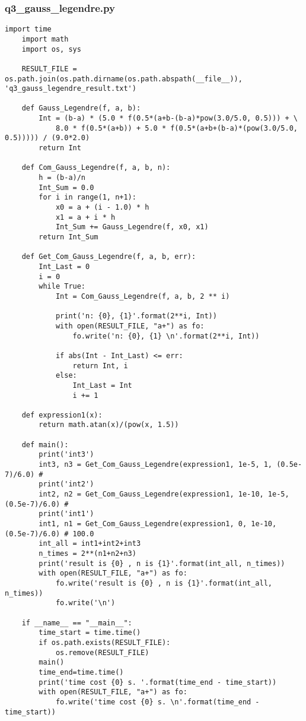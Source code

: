 \subsubsection{q3\_gauss\_legendre.py}

\begin{lstlisting}[style = python]
    import time
    import math
    import os, sys
    
    RESULT_FILE = os.path.join(os.path.dirname(os.path.abspath(__file__)), 'q3_gauss_legendre_result.txt')
    
    def Gauss_Legendre(f, a, b):
        Int = (b-a) * (5.0 * f(0.5*(a+b-(b-a)*pow(3.0/5.0, 0.5))) + \
            8.0 * f(0.5*(a+b)) + 5.0 * f(0.5*(a+b+(b-a)*(pow(3.0/5.0, 0.5))))) / (9.0*2.0)
        return Int
    
    def Com_Gauss_Legendre(f, a, b, n):
        h = (b-a)/n
        Int_Sum = 0.0
        for i in range(1, n+1):
            x0 = a + (i - 1.0) * h
            x1 = a + i * h
            Int_Sum += Gauss_Legendre(f, x0, x1)
        return Int_Sum
    
    def Get_Com_Gauss_Legendre(f, a, b, err):
        Int_Last = 0
        i = 0
        while True:
            Int = Com_Gauss_Legendre(f, a, b, 2 ** i)
    
            print('n: {0}, {1}'.format(2**i, Int))
            with open(RESULT_FILE, "a+") as fo:
                fo.write('n: {0}, {1} \n'.format(2**i, Int))
    
            if abs(Int - Int_Last) <= err:
                return Int, i
            else:
                Int_Last = Int
                i += 1
    
    def expression1(x):
        return math.atan(x)/(pow(x, 1.5))
    
    def main():
        print('int3')
        int3, n3 = Get_Com_Gauss_Legendre(expression1, 1e-5, 1, (0.5e-7)/6.0) # 
        print('int2')
        int2, n2 = Get_Com_Gauss_Legendre(expression1, 1e-10, 1e-5, (0.5e-7)/6.0) #
        print('int1')
        int1, n1 = Get_Com_Gauss_Legendre(expression1, 0, 1e-10, (0.5e-7)/6.0) # 100.0
        int_all = int1+int2+int3
        n_times = 2**(n1+n2+n3)
        print('result is {0} , n is {1}'.format(int_all, n_times))
        with open(RESULT_FILE, "a+") as fo:
            fo.write('result is {0} , n is {1}'.format(int_all, n_times))
            fo.write('\n')
    
    if __name__ == "__main__":
        time_start = time.time()
        if os.path.exists(RESULT_FILE):
            os.remove(RESULT_FILE)
        main()
        time_end=time.time()
        print('time cost {0} s. '.format(time_end - time_start))
        with open(RESULT_FILE, "a+") as fo:
            fo.write('time cost {0} s. \n'.format(time_end - time_start))
\end{lstlisting}

